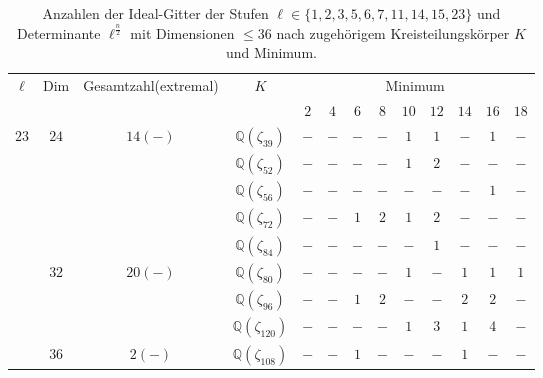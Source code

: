 \documentclass[12pt,a4paper,halfparskip,headsepline,bibtotocnumbered]{scrreprt}
\theoremstyle{nummermitklammern}
\theoremstyle{nonumberbreak}
\newcommand{\Q}{\mathbb{Q}}
\begin{document}
\begin{table}
	\centering
	\begin{tabular}{|c|c|c|c|c|c|c|c|c|c|c|c|c|}
		\hline		
		\multirow{2}{*}{$\ell$}	&\multirow{2}{*}{Dim}	&\multirow{2}{*}{Gesamtzahl(extremal)}	&\multirow{2}{*}{$K$}	&\multicolumn{9}{c|}{Minimum}\\ \cline{5-13}
								&						&							&					&$2$	&$4$	&$6$	&$8$	&$10$	&$12$	&$14$	&$16$	&$18$\\ \hline
		\multirow{9}{*}{$23$}	&\multirow{5}{*}{$24$}	&\multirow{5}{*}{$14(-)$}	&$\Q(\zeta_{39})$	&$-$	&$-$	&$-$	&$-$	&$1$	&$1$	&$-$	&$1$	&$-$\\ \cline{4-13}
								&						&							&$\Q(\zeta_{52})$	&$-$	&$-$	&$-$	&$-$	&$1$	&$2$	&$-$	&$-$	&$-$\\ \cline{4-13}
								&						&							&$\Q(\zeta_{56})$	&$-$	&$-$	&$-$	&$-$	&$-$	&$-$	&$-$	&$1$	&$-$\\ \cline{4-13}
								&						&							&$\Q(\zeta_{72})$	&$-$	&$-$	&$1$	&$2$	&$1$	&$2$	&$-$	&$-$	&$-$\\ \cline{4-13}
								&						&							&$\Q(\zeta_{84})$	&$-$	&$-$	&$-$	&$-$	&$-$	&$1$	&$-$	&$-$	&$-$\\ \cline{2-13}
								&\multirow{3}{*}{$32$}	&\multirow{3}{*}{$20(-)$}	&$\Q(\zeta_{80})$	&$-$	&$-$	&$-$	&$-$	&$1$	&$-$	&$1$	&$1$	&$1$\\ \cline{4-13}
								&						&							&$\Q(\zeta_{96})$	&$-$	&$-$	&$1$	&$2$	&$-$	&$-$	&$2$	&$2$	&$-$\\ \cline{4-13}
								&						&							&$\Q(\zeta_{120})$	&$-$	&$-$	&$-$	&$-$	&$1$	&$3$	&$1$	&$4$	&$-$\\ \cline{2-13}
								&$36$					&$2(-)$						&$\Q(\zeta_{108})$	&$-$	&$-$	&$1$	&$-$	&$-$	&$-$	&$1$	&$-$	&$-$\\ \hline
	\end{tabular}
	\caption{Anzahlen der Ideal-Gitter der Stufen $\ell \in \lbrace 1,2,3,5,6,7,11,14,15,23 \rbrace$ und Determinante $\ell^\frac{n}{2}$ mit Dimensionen $\leq 36$ nach zugehörigem Kreisteilungskörper $K$ und Minimum.}
\end{table}
\newpage

\end{document}
